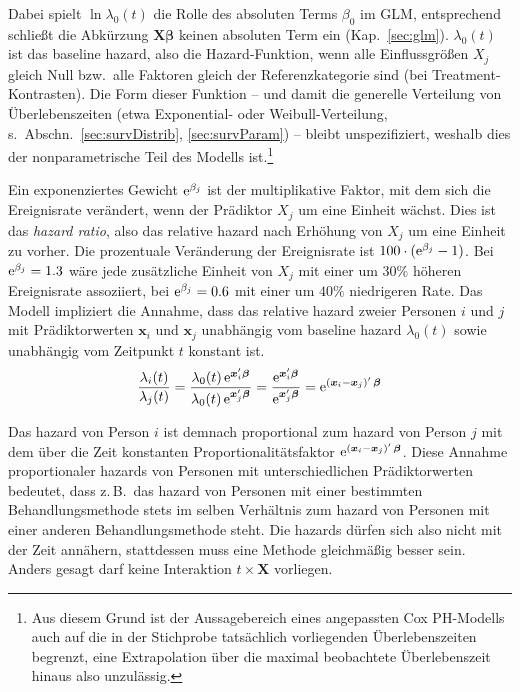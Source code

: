 Dabei spielt $\ln \lambda_{0}(t)$ die Rolle des absoluten Terms $\beta_{0}$ im GLM, entsprechend schließt die Abkürzung $\bm{X} \bm{\beta}$ keinen absoluten Term ein (Kap.\ \ref{sec:glm}). $\lambda_{0}(t)$ ist das baseline hazard, also die Hazard-Funktion, wenn alle Einflussgrößen $X_{j}$ gleich Null bzw.\ alle Faktoren gleich der Referenzkategorie sind (bei Treatment-Kontrasten). Die Form dieser Funktion -- und damit die generelle Verteilung von Überlebenszeiten (etwa Exponential- oder Weibull-Verteilung, s.\ Abschn.\ \ref{sec:survDistrib}, \ref{sec:survParam}) -- bleibt unspezifiziert, weshalb dies der nonparametrische Teil des Modells ist.\footnote{Aus diesem Grund ist der Aussagebereich eines angepassten Cox PH-Modells auch auf die in der Stichprobe tatsächlich vorliegenden Überlebenszeiten begrenzt, eine Extrapolation über die maximal beobachtete Überlebenszeit hinaus also unzulässig.}

Ein exponenziertes Gewicht ${\mathrm{e}}^{\beta_{j}}$ ist der multiplikative Faktor, mit dem sich die Ereignisrate verändert, wenn der Prädiktor $X_{j}$ um eine Einheit wächst. Dies ist das \emph{hazard ratio}, also das relative hazard nach Erhöhung von $X_{j}$ um eine Einheit zu vorher. Die prozentuale Veränderung der Ereignisrate ist $100 \cdot ({\mathrm{e}}^{\beta_{j}} - 1)$. Bei ${\mathrm{e}}^{\beta_{j}} = 1.3$ wäre jede zusätzliche Einheit von $X_{j}$ mit einer um $30\%$ höheren Ereignisrate assoziiert, bei ${\mathrm{e}}^{\beta_{j}} = 0.6$ mit einer um $40\%$ niedrigeren Rate. Das Modell impliziert die Annahme, dass das relative hazard zweier Personen $i$ und $j$ mit Prädiktorwerten $\bm{x}_{i}$ und $\bm{x}_{j}$ unabhängig vom baseline hazard $\lambda_{0}(t)$ sowie unabhängig vom Zeitpunkt $t$ konstant ist.
\begin{equation*}
\frac{\lambda_{i}(t)}{\lambda_{j}(t)} = \frac{\lambda_{0}(t) \, {\mathrm{e}}^{\bm{x}'_{i} \bm{\beta}}}{\lambda_{0}(t) \, {\mathrm{e}}^{\bm{x}'_{j} \bm{\beta}}} = \frac{{\mathrm{e}}^{\bm{x}'_{i} \bm{\beta}}}{{\mathrm{e}}^{\bm{x}'_{j} \bm{\beta}}} = {\mathrm{e}}^{(\bm{x}_{i} - \bm{x}_{j})' \, \bm{\beta}}
\end{equation*}

Das hazard von Person $i$ ist demnach proportional zum hazard von Person $j$ mit dem über die Zeit konstanten Proportionalitätsfaktor ${\mathrm{e}}^{(\bm{x}_{i} - \bm{x}_{j})' \, \bm{\beta}}$. Diese Annahme proportionaler hazards von Personen mit unterschiedlichen Prädiktorwerten bedeutet, dass z.\,B.\ das hazard von Personen mit einer bestimmten Behandlungsmethode stets im selben Verhältnis zum hazard von Personen mit einer anderen Behandlungsmethode steht. Die hazards dürfen sich also nicht mit der Zeit annähern, stattdessen muss eine Methode gleichmäßig besser sein. Anders gesagt darf keine Interaktion $t \times \bm{X}$ vorliegen.

